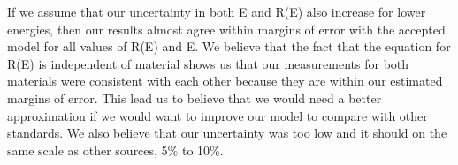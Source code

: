 If we assume that our uncertainty in both E and R(E) also increase for lower energies, then our results almost agree within margins of error with the accepted model for all values of R(E) and E.  We believe that the fact that the equation for R(E) is independent of material shows us that our measurements for both materials were consistent with each other because they are within our estimated margins of error.  This lead us to believe that we would need a better approximation if we would want to improve our model to compare with other standards.  We also believe that our uncertainty was too low and it should on the same scale as other sources, 5\% to 10\%.

